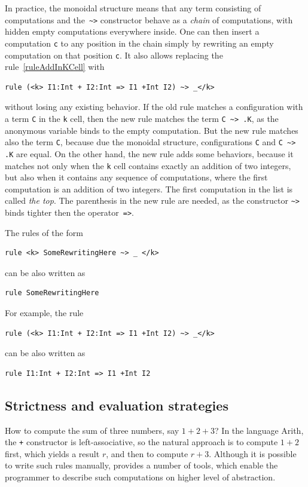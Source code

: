 \documentclass{fithesis3}
\begin{document}
In practice, the monoidal structure means that any term consisting of computations and the~\lstinline{~>}{} constructor behave as a \textit{chain} of computations, with hidden empty computations everywhere inside. One can then insert a computation \texttt{c} to any position in the chain simply by rewriting an empty computation on that position \texttt{c}. It also allows replacing the rule~\ref{ruleAddInKCell} with
\begin{lstlisting}
rule (<k> I1:Int + I2:Int => I1 +Int I2) ~> _</k>
\end{lstlisting}
without losing any existing behavior. If the old rule matches a configuration with a term \lstinline{C}{} in the \texttt{k} cell, then the new rule matches the term \lstinline{C ~> .K}{}, as the anonymous variable binds to the empty computation. But the new rule matches also the term \lstinline{C}{}, because due the monoidal structure, configurations \lstinline{C}{} and \lstinline{C ~> .K}{} are equal.
On the other hand, the new rule adds some behaviors, because it matches not only when the \texttt{k} cell contains exactly an addition of two integers, but also when it contains any sequence of computations, where the first computation is an addition of two integers. The first computation in the list is called \textit{the top}.
The parenthesis in the new rule are needed, as the constructor \lstinline{~>}{} binds tighter then the operator~\lstinline{=>}{}.


The rules of the form
\begin{lstlisting}
rule <k> SomeRewritingHere ~> _ </k>
\end{lstlisting}
can be also written as
\begin{lstlisting}
rule SomeRewritingHere
\end{lstlisting}
For example, the rule
\begin{lstlisting}
rule (<k> I1:Int + I2:Int => I1 +Int I2) ~> _</k>
\end{lstlisting}
can be also written as
\begin{lstlisting}
rule I1:Int + I2:Int => I1 +Int I2
\end{lstlisting}

\subsection{Strictness and evaluation strategies}

How to compute the sum of three numbers, say $1 + 2 + 3$? In the language Arith, the \texttt{+} constructor is left-associative, so the natural approach is to compute $1 + 2$ first, which yields a result $r$, and then to compute $r + 3$. Although it is possible to write such rules manually, \K provides a number of tools, which enable the programmer to describe such computations on higher level of abstraction.
\end{document}
